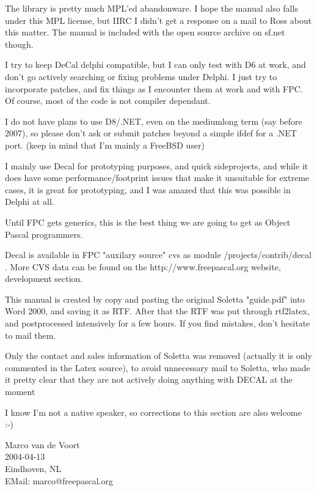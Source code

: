 \documentclass{report}
\begin{document}
The library is pretty much MPL'ed abandonware. I hope the manual also falls
under this MPL license, but IIRC I didn't get a response on a mail to Ross
about this matter. The manual is included with the open source archive
on sf.net though.

I try to keep DeCal delphi compatible, but I can only test with D6 at work,
and don't go actively searching or fixing problems under Delphi. I just try
to incorporate patches, and fix things as I encounter them at work and with
FPC. Of course, most of the code is not compiler dependant.

I do not have plans to use D8/.NET, even on the mediumlong term (say before
2007), so please don't ask or submit patches beyond a simple ifdef for a
.NET port. (keep in mind that I'm mainly a FreeBSD user)

I mainly use Decal for prototyping purposes, and quick sideprojects, and
while it does have some performance/footprint issues that make it unsuitable
for extreme cases, it is great for prototyping, and I was amazed that this was
possible in Delphi at all.

Until FPC gets generics, this is the best thing we are going to get as
Object Pascal programmers.

Decal is available in FPC "auxilary source" cvs as module
/projects/contrib/decal . More CVS data can be found on the
http://www.freepascal.org website, development section.

This manual is created by copy and pasting the original Soletta "guide.pdf"
into Word 2000, and saving it as RTF. After that the RTF was put through
rtf2latex, and postprocessed intensively for a few hours. If you find
mistakes, don't hesitate to mail them.

Only the contact and sales information of Soletta was removed (actually it
is only commented in the Latex source), to avoid unnecessary mail to
Soletta, who made it pretty clear that they are not actively doing anything
with DECAL at the moment

I know I'm not a native speaker, so corrections to this section are also
welcome :-)

\begin{flushright}
Marco van de Voort \\
2004-04-13 \\
Eindhoven, NL  \\
EMail: marco@freepascal.org \\
\end{flushright}
\end{document}
